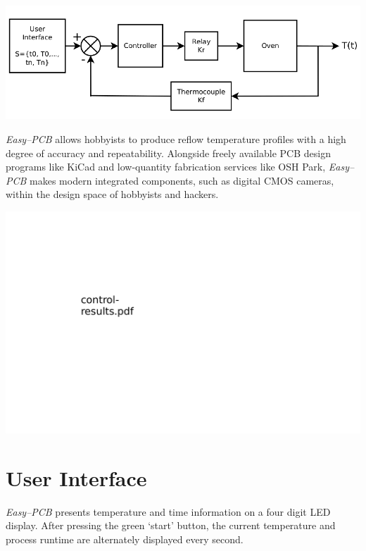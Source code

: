 \documentclass[10pt, twocolumn]{article}
\begin{document}
\begin{center}
	\includegraphics[width=\columnwidth]{Figures/control-system.pdf}
\end{center}

\emph{Easy--PCB} allows hobbyists to produce reflow temperature profiles with
a high degree of accuracy and repeatability.
Alongside freely available PCB design programs like KiCad and low-quantity
fabrication services like OSH Park, \emph{Easy--PCB} makes
modern integrated components, such as digital CMOS cameras,
within the design space of hobbyists and hackers.

\begin{center}
	\includegraphics[width=\columnwidth]{Figures/control-results.pdf}
\end{center}

\tableofcontents

\section{User Interface}

\emph{Easy--PCB} presents temperature and time information on a four digit LED display.
After pressing the green `start' button, the current temperature and process
runtime are alternately displayed every second.
\end{document}
